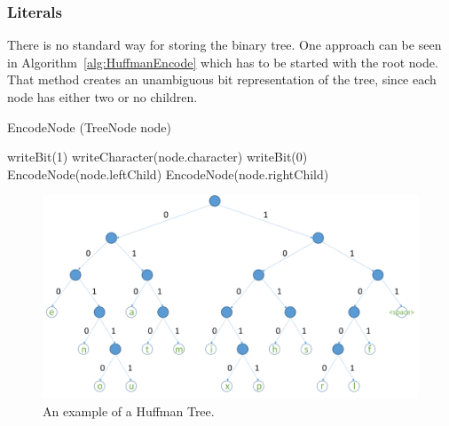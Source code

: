 \subsubsection{Literals}\label{sec:implementationLiterals}
There is no standard way for storing the binary tree. One approach can be seen in Algorithm~\ref{alg:HuffmanEncode} which has to be started with the root node. That method creates an unambiguous bit representation of the tree, since each node has either two or no children.

\begin{algorithm}
	\caption{EncodeNode (TreeNode node)}\label{alg:HuffmanEncode}
	\begin{algorithmic}[1]
		\State writeBit(1)
		\State writeCharacter(node.character)
		\Else
		\State writeBit(0)
		\State EncodeNode(node.leftChild)
		\State EncodeNode(node.rightChild)
		\EndIf
	\end{algorithmic}
\end{algorithm}

\begin{figure}
	\centering
	\includegraphics[width=0.9\linewidth]{figures/4_rdf_specific_features/huffman}
	\caption{An example of a Huffman Tree.}
	\label{fig:huffmantree}
\end{figure}


